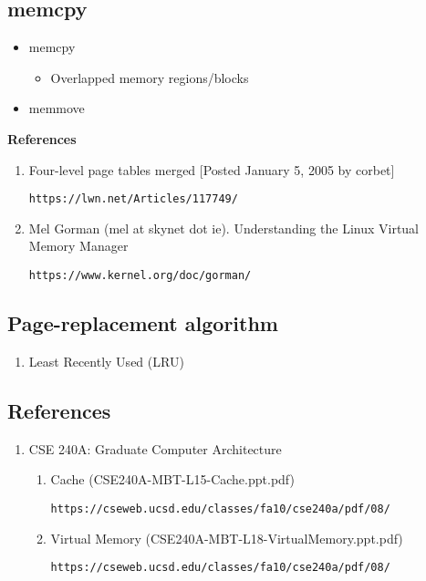 \documentclass[12pt,a4paper]{article}
\begin{document}
\subsection{memcpy}

\begin{itemize}
\item memcpy

	\begin{itemize}
	\item Overlapped memory regions/blocks
	\end{itemize}

\item memmove
\end{itemize}

\textbf{References}

\begin{enumerate}
\item Four-level page tables merged [Posted January 5, 2005 by corbet]

	\texttt{https://lwn.net/Articles/117749/}

\item Mel Gorman (mel at skynet dot ie).  Understanding the Linux Virtual Memory Manager

	\texttt{https://www.kernel.org/doc/gorman/}
\end{enumerate}

\subsection{Page-replacement algorithm}

\begin{enumerate}

\item Least Recently Used (LRU)

\end{enumerate}

\subsection{References}

\begin{enumerate}

\item CSE 240A: Graduate Computer Architecture

	\begin{enumerate}

	\item Cache (CSE240A-MBT-L15-Cache.ppt.pdf)

	\texttt{https://cseweb.ucsd.edu/classes/fa10/cse240a/pdf/08/}

	\item Virtual Memory (CSE240A-MBT-L18-VirtualMemory.ppt.pdf)

	\texttt{https://cseweb.ucsd.edu/classes/fa10/cse240a/pdf/08/}

	\end{enumerate}

\end{enumerate}
\end{document}
